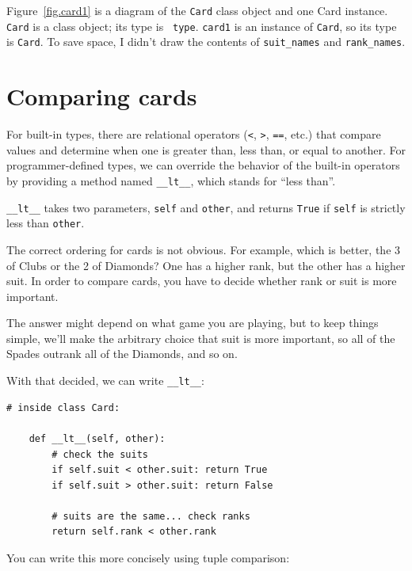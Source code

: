 \documentclass[10pt]{book}
\begin{document}
Figure~\ref{fig.card1} is a diagram of the {\tt Card} class object and
one Card instance.  {\tt Card} is a class object; its type is {\tt
  type}.  {\tt card1} is an instance of {\tt Card}, so its type is
{\tt Card}.  To save space, I didn't draw the contents of
\verb"suit_names" and \verb"rank_names".  
  


\section{Comparing cards}
\label{comparecard}

For built-in types, there are relational operators
({\tt <}, {\tt >}, {\tt ==}, etc.)
that compare
values and determine when one is greater than, less than, or equal to
another.  For programmer-defined types, we can override the behavior of
the built-in operators by providing a method named
\verb"__lt__", which stands for ``less than''.

\verb"__lt__" takes two parameters, {\tt self} and {\tt other},
and returns {\tt True} if {\tt self} is strictly less than {\tt other}.

The correct ordering for cards is not obvious.
For example, which
is better, the 3 of Clubs or the 2 of Diamonds?  One has a higher
rank, but the other has a higher suit.  In order to compare
cards, you have to decide whether rank or suit is more important.

The answer might depend on what game you are playing, but to keep
things simple, we'll make the arbitrary choice that suit is more
important, so all of the Spades outrank all of the Diamonds,
and so on.

With that decided, we can write \verb"__lt__":

\begin{verbatim}
# inside class Card:

    def __lt__(self, other):
        # check the suits
        if self.suit < other.suit: return True
        if self.suit > other.suit: return False

        # suits are the same... check ranks
        return self.rank < other.rank
\end{verbatim}
%
You can write this more concisely using tuple comparison:
\end{document}
